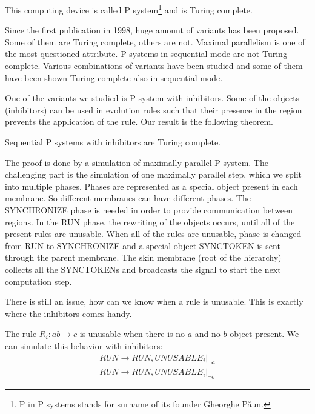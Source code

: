 \documentclass{svk_short_en}
\begin{document}
This computing device is called P system\footnote{P in P systems stands for surname of its founder Gheorghe P\u aun.} and is Turing complete.

Since the first publication in 1998, huge amount of variants has been proposed. Some of them are Turing complete, others are not. Maximal parallelism is one of the most questioned attribute. P systems in sequential mode are not Turing complete. Various combinations of variants have been studied and some of them have been shown Turing complete also in sequential mode.

One of the variants we studied is P system with inhibitors. Some of the objects (inhibitors) can be used in evolution rules such that their presence in the region prevents the application of the rule. Our result is the following theorem.

\begin{theorem}
\label{th:prop}
Sequential P systems with inhibitors are Turing complete.
\end{theorem}

The proof is done by a simulation of maximally parallel P system. The challenging part is the simulation of one maximally parallel step, which we split into  multiple phases. Phases are represented as a special object present in each membrane. So different membranes can have different phases.
The SYNCHRONIZE phase is needed in order to provide communication between regions.
In the RUN phase, the rewriting of the objects occurs, until all of the present rules are unusable. When all of the rules are unusable, phase is changed from RUN to SYNCHRONIZE and a special object SYNCTOKEN is sent through the parent membrane. The skin membrane (root of the hierarchy) collects all the SYNCTOKENs and broadcasts the signal to start the next computation step.

There is still an issue, how can we know when a rule is unusable. This is exactly where the inhibitors comes handy.

The rule $R_i: ab \rightarrow c$ is unusable when there is no $a$ and no $b$ object present. We can simulate this behavior with inhibitors:
\begin{align*}
  RUN \rightarrow RUN, UNUSABLE_i |_{\neg a}
  \\
  RUN \rightarrow RUN, UNUSABLE_i |_{\neg b}
\end{align*}




\end{document}
